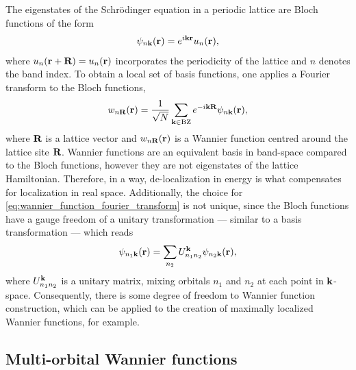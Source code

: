 \documentclass[../../main.tex]{subfiles}
\begin{document}
The eigenstates of the Schrödinger equation in a periodic lattice are Bloch functions of the form
\begin{align}
	\psi_{n\textbf{k}}(\textbf{r})=e^{i\textbf{kr}}u_n(\textbf{r}),
\end{align}
where $u_n(\textbf{r}+\textbf{R})=u_n(\textbf{r})$ incorporates the periodicity of the lattice and $n$ denotes the band index. To obtain a local set of basis functions, one applies a Fourier transform to the Bloch functions,
\begin{align}\label{eq:wannier_function_fourier_transform}
	w_{n\textbf{R}}(\textbf{r})=\frac{1}{\sqrt{N}}\sum_{\textbf{k}\in\text{BZ}}e^{-i\textbf{kR}}\psi_{n\textbf{k}}(\textbf{r}),
\end{align}
where $\textbf{R}$ is a lattice vector and $w_{n\textbf{R}}(\textbf{r})$ is a Wannier function centred around the lattice site $\textbf{R}$. Wannier functions are an equivalent basis in band-space compared to the Bloch functions, however they are not eigenstates of the lattice Hamiltonian. Therefore, in a way, de-localization in energy is what compensates for localization in real space. Additionally, the choice for \eqref{eq:wannier_function_fourier_transform} is not unique, since the Bloch functions have a gauge freedom of a unitary transformation --- similar to a basis transformation --- which reads
\begin{align}\label{eq:unitary_transformation_bloch_functions}
	\psi_{n_1\textbf{k}}(\textbf{r})=\sum_{n_2}U_{n_1 n_2}^{\textbf{k}}\psi_{n_2\textbf{k}}(\textbf{r}),
\end{align}
where $U_{n_1 n_2}^{\textbf{k}}$ is a unitary matrix, mixing orbitals $n_1$ and $n_2$ at each point in $\textbf{k}$-space. Consequently, there is some degree of freedom to Wannier function construction, which can be applied to the creation of maximally localized Wannier functions, for example.

\subsection{Multi-orbital Wannier functions}
\end{document}
